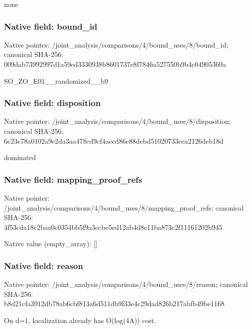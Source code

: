 \documentclass[10pt,a4paper]{article}
\begin{document}
\begingroup\raggedright\sloppy none\par\endgroup

\subsubsection{Native field: bound\_\allowbreak{}id}
Native pointer: /joint\_\allowbreak{}analysis/comparisons/4/bound\_\allowbreak{}uses/8/bound\_\allowbreak{}id; canonical SHA-256: 009dab73992997d1a59ed3330938b8601737e8f7846a527550b9b4c04905360a

\begingroup\raggedright\sloppy SO\_\allowbreak{}ZO\_\allowbreak{}E01\_\allowbreak{}\_\allowbreak{}randomized\_\allowbreak{}\_\allowbreak{}b9\par\endgroup

\subsubsection{Native field: disposition}
Native pointer: /joint\_\allowbreak{}analysis/comparisons/4/bound\_\allowbreak{}uses/8/disposition; canonical SHA-256: 6c23c78a0102a9e2da3aa478cd9cf4aecd86c88debd51020733eca2126deb18d

\begingroup\raggedright\sloppy dominated\par\endgroup

\subsubsection{Native field: mapping\_\allowbreak{}proof\_\allowbreak{}refs}
Native pointer: /joint\_\allowbreak{}analysis/comparisons/4/bound\_\allowbreak{}uses/8/mapping\_\allowbreak{}proof\_\allowbreak{}refs; canonical SHA-256: 4f53cda18c2baa0c0354bb5f9a3ecbe5ed12ab4d8e11ba873c2f11161202b945

Native value (empty\_\allowbreak{}array): []

\subsubsection{Native field: reason}
Native pointer: /joint\_\allowbreak{}analysis/comparisons/4/bound\_\allowbreak{}uses/8/reason; canonical SHA-256: b8d21cfa3912db78ab6cbf813a6d511db9f33e4c29dad826b217abfb49be1168

\begingroup\raggedright\sloppy On d=\allowbreak{}1,\allowbreak{} localization already has O(log(4A)) cost.\par\endgroup
\end{document}
